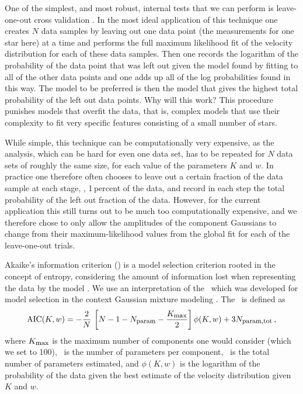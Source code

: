 One of the simplest, and most robust, internal tests that we can
perform is leave-one-out cross validation \citep{stone74a}. In the
most ideal application of this technique one creates $N$ data samples
by leaving out one data point (the measurements for one star here) at
a time and performs the full maximum likelihood fit of the velocity
distribution for each of these data samples. Then one records the
logarithm of the probability of the data point that was left out given
the model found by fitting to all of the other data points and one
adds up all of the log probabilities found in this way. The model to
be preferred is then the model that gives the highest total
probability of the left out data points. Why will this work? This
procedure punishes models that overfit the data, that is, complex
models that use their complexity to fit very specific features
consisting of a small number of stars.

While simple, this technique can be computationally very expensive, as
the analysis, which can be hard for even one data set, has to be
repeated for $N$ data sets of roughly the same size, for each value of
the parameters $K$ and $w$. In practice one therefore often chooses to
leave out a certain fraction of the data sample at each stage, \eg,
1\,percent of the data, and record in each step the total probability
of the left out fraction of the data. However, for the current
application this still turns out to be much too computationally
expensive, and we therefore chose to only allow the amplitudes of the
component Gaussians to change from their maximum-likelihood values
from the global fit for each of the leave-one-out trials.

Akaike's information criterion (\AIC) is a model selection criterion
rooted in the concept of entropy, considering the amount of
information lost when representing the data by the model
\citep{Akaike}. We use an interpretation of the \AIC\ which was
developed for model selection in the context Gaussian mixture modeling
\citep{Bozdogan,Windham}. The \AIC\ is defined as
\begin{equation}
\mathrm{AIC}(K,w)= -\frac{2}{N}\,\left[N-1-N_{\mbox{{\footnotesize param}}}-\frac{K_{\mbox{{\footnotesize max}}}}{2}\right]\phi(K,w)+3N_{\mbox{{\footnotesize param,tot}}}\, ,
\end{equation}
where $K_{\mbox{{\footnotesize max}}}$ is the maximum number of components
one would consider (which we set to 100), \nparam\ is the number of
parameters per component, \totalnparam\ is the total number of
parameters estimated, and $\phi(K,w)$ is the logarithm of the
probability of the data given the best estimate of the velocity
distribution given $K$ and $w$.

